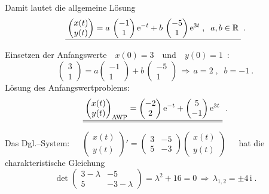 {\begin{iii}
Damit lautet die allgemeine Lösung 
\[
\underline{\;\begin{pmatrix} x(t) \\ y(t) \end{pmatrix} = a\,\begin{pmatrix} -1 \\ 1 \end{pmatrix} \mathrm{e}^{-t} + b\,\begin{pmatrix} -5 \\ 1 \end{pmatrix} \mathrm{e}^{3t}\;,\;\;a,b\in\mathbb{R}\;}\;. 
\]

Einsetzen der Anfangswerte\ \ $x(0)=3$\ \ und\ \ $y(0)=1$\ : 
\[
\begin{pmatrix}
3 \\ 
1
\end{pmatrix} =a\begin{pmatrix}
-1 \\ 
1
\end{pmatrix} + b\,\begin{pmatrix}
-5 \\ 
1
\end{pmatrix}
\,\Rightarrow\, a=2\;,\;\;b=-1\ . 
\]
Lösung des Anfangswertproblems: 
\[
\underline{\underline{\;\begin{pmatrix} x(t) \\ y(t) \end{pmatrix}_{\text{AWP}} = \begin{pmatrix} -2 \\ 2 \end{pmatrix} \mathrm{e}^{-t} + 
\begin{pmatrix} 5 \\ -1 \end{pmatrix}\mathrm{e}^{3t}\ }}\ . 
\]


\item  Das Dgl.--System:\ \ \ $\begin{pmatrix}
x(t) \\ 
y(t)
\end{pmatrix}' = \begin{pmatrix}
3 & -5 \\ 
5 & -3
\end{pmatrix}\begin{pmatrix}
x(t) \\ 
y(t)
\end{pmatrix}
 $\ \ \ hat die charakteristische Gleichung 
\[
\det \begin{pmatrix}
3-\lambda & -5 \\ 
5 & -3-\lambda
\end{pmatrix}
 =\lambda ^{2}+16=0 \,\Rightarrow\, \lambda _{1,2}=\pm 4\,
\text{i}\;. 
\]


\end{iii}}
